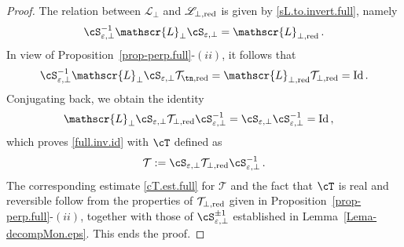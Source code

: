 \documentclass[a4paper,reqno,10pt]{article}
\newcommand{\sL}{\mathscr{L}}
\begin{document}
\begin{proof}
  The relation between $\sL_{\perp}$ and $\sL_{\perp,{\rm red}}$ is given by \eqref{sL.to.invert.full}, namely
   \begin{align}
\cS_{\varepsilon,\perp}^{-1}\sL_{\perp} \cS_{\varepsilon,\perp}=\sL_{\perp,{\rm red}}\,.
        \end{align}
        In view of Proposition~\ref{prop-perp.full}-$(ii)$, it follows that 
        \begin{align}
		\cS_{\varepsilon,\perp}^{-1}\sL_{\perp} \cS_{\varepsilon,\perp}\mathcal{T}_{\tn,{\rm red}}=\sL_{\perp,{\rm red}}\mathcal{T}_{\perp,{\rm red}} =  {\rm Id}\,.
        \end{align}
        Conjugating back, we obtain the identity
        \begin{align}
		\sL_{\perp} \cS_{\varepsilon,\perp}\mathcal{T}_{\perp,{\rm red}}\cS_{\varepsilon,\perp}^{-1}
        & = \cS_{\varepsilon,\perp} \cS_{\varepsilon,\perp}^{-1} = {\rm Id}\,,
        \end{align}
        which proves \eqref{full.inv.id}  with $\cT$ defined as
        \begin{equation}\label{ARI.cT.n}
            \mathcal{T}:= \cS_{\varepsilon,\perp}\mathcal{T}_{\perp,{\rm red}}\cS_{\varepsilon,\perp}^{-1}\,.
        \end{equation}
        The corresponding estimate \eqref{cT.est.full} for $\mathcal{T}$  and the fact that $\cT$ is real and reversible follow from the properties  of  $\mathcal{T}_{\perp,{\rm red}}$ given in Proposition~\ref{prop-perp.full}-$(ii)$, together with those of $\cS_{\varepsilon,\perp}^{\pm1}$ established in Lemma~\ref{Lema-decompMon.eps}.  This ends the proof.
\end{proof}
\end{document}
